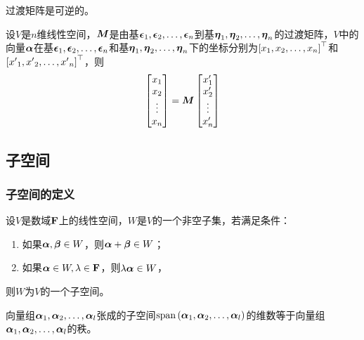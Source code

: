 \documentclass{ctexart}
\begin{document}
\begin{theorem}
    过渡矩阵是可逆的。
\end{theorem}

\begin{theorem}[坐标变换公式]
    设\(V\)是\(n\)维线性空间，\(\matm\)是由基\(\enums{\veceps}{n}\)到基\(\enums{\veceta}{n}\)的过渡矩阵，\(V\)中的向量\(\vecal\)在基\(\enums{\veceps}{n}\)和基\(\enums{\veceta}{n}\)下的坐标分别为\(\mat{\enums{x}{n}}^\top\)和\(\mat{\enums{x'}{n}}^\top\)，则
    \begin{equation*}
        \begin{bmatrix}
            x_1 \\x_2\\\vdots\\x_n
        \end{bmatrix}=\matm\begin{bmatrix}
            x'_1 \\x'_2\\\vdots\\x'_n
        \end{bmatrix}
    \end{equation*}
\end{theorem}

\subsection{子空间}

\subsubsection*{子空间的定义}

\begin{theorem}
    设\(V\)是数域\(\field\)上的线性空间，\(W\)是\(V\)的一个非空子集，若满足条件：
    \begin{enumerate}
        \item 如果\(\vecal,\vecbeta\in W\)，则\(\vecal+\vecbeta\in W\)；
        \item 如果\(\vecal\in W,\lambda\in\field\)，则\(\lambda\vecal\in W\)，
    \end{enumerate}
    则\(W\)为\(V\)的一个子空间。
\end{theorem}

\begin{theorem}
    向量组\(\enums{\vecal}{l}\)张成的子空间\(\myspan{\enums{\vecal}{l}}\)的维数等于向量组\(\enums{\vecal}{l}\)的秩。
\end{theorem}
\end{document}
